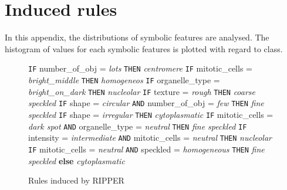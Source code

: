 
\chapter{Induced rules} %

\label{AppendixB} %


In this appendix, the distributions of symbolic features are analysed. The histogram of values for each symbolic features is plotted with regard to class.



\begin{figure}
	\caption{Rules induced by RIPPER }
	\label{fig:RulesRIPPER}
	\small
	\centering
	
		\begin{algorithmic}[1]
			\State \texttt{IF} number\_of\_obj = \textit{lots} 
			\Statex \texttt{THEN} \textit{centromere}
			\State \texttt{IF} mitotic\_cells = \textit{bright\_middle} 
			\Statex \texttt{THEN} \textit{homogeneos}
			\State \texttt{IF} organelle\_type = \textit{bright\_on\_dark} 
			\Statex \texttt{THEN} \textit{nucleolar}
			\State \texttt{IF} texture = \textit{rough} 
			\Statex \texttt{THEN} \textit{coarse speckled}
			\State \texttt{IF} shape = \textit{circular}  \texttt{AND} number\_of\_obj = \textit{few}
			\Statex \texttt{THEN} \textit{fine speckled}
			\State \texttt{IF} shape = \textit{irregular} 
			\Statex \texttt{THEN} \textit{cytoplasmatic}
			\State \texttt{IF} mitotic\_cells = \textit{dark spot} \texttt{AND} organelle\_type = \textit{neutral} 
			\Statex \texttt{THEN} \textit{fine speckled}
			\State \texttt{IF} intensity = \textit{intermediate} \texttt{AND} mitotic\_cells = \textit{neutral} 
			\Statex \texttt{THEN} \textit{nucleolar}
			\State \texttt{IF} mitotic\_cells = \textit{neutral} \texttt{AND} speckled = \textit{homogeneous} 
			\Statex \texttt{THEN} \textit{fine speckled}
			\State \textbf{else} \textit{cytoplasmatic}
		\end{algorithmic}
	
\end{figure}


